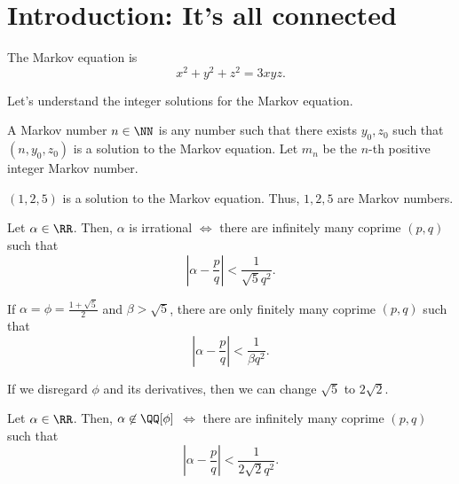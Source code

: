 \newpage
{}
\section{Introduction: It's all connected}

The Markov equation is \[
	x^2 + y^2 + z^2 = 3xyz.
\]

Let's understand the integer solutions for the Markov equation.

\begin{defn}
	A Markov number $n \in \NN$ is any number such that there exists $y_0, z_0$ such that $(n, y_0, z_0)$ is a solution to the Markov equation.
	Let $m_n$ be the $n$-th positive integer Markov number.
\end{defn}

\begin{exmp}
	$(1, 2, 5)$ is a solution to the Markov equation. Thus,  $1, 2, 5$ are Markov numbers.
\end{exmp}


\begin{thm}
	Let $\alpha \in \RR$. Then, $\alpha$ is irrational $\iff$ there are infinitely many coprime $(p, q)$ such that \[
		\left|\alpha - \frac{p}{q}\right| < \frac{1}{\sqrt{5}q^2}.
	\]
\end{thm}

\begin{thm}
	If $\alpha = \phi = \frac{1 + \sqrt{5}}{2}$ and $\beta > \sqrt{5}$, there are only finitely many coprime  $(p, q)$ such that \[
		\left|\alpha - \frac{p}{q}\right| < \frac{1}{\beta q^2}.	
	\]
\end{thm}

If we disregard $\phi$ and its derivatives, then we can change $\sqrt{5}$ to $2\sqrt{2}$.

\begin{thm}
	Let $\alpha \in \RR$. Then, $\alpha \not\in \QQ[\phi]$ $\iff$ there are infinitely many coprime $(p, q)$ such that \[
		\left|\alpha - \frac{p}{q}\right| < \frac{1}{2\sqrt{2}q^2}.
	\]
\end{thm}

